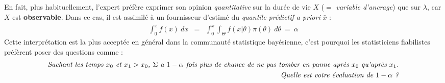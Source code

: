 En fait, plus habituellement, l'expert préfère exprimer son opinion \emph{quantitative} sur la durée de vie $X$
 ($=$ \emph{variable d'ancrage}) que sur $\lambda$, car $X$ est {\bf observable}. Dans ce cas, il est assimilé à un fournisseur d'estimé du \emph{quantile prédictif {\it a priori}} $\bar{x}$ :
\begin{eqnarray*}
\int_{0}^{\bar{x}} f(x) \ dx & = & \int_{0}^{\bar{x}} \int_{\Theta} f(x|\theta)\pi(\theta) \ d\theta \ = \ \alpha
\end{eqnarray*}
Cette interprétation est la plus acceptée en général dans la communauté statistique bayésienne, c'est pourquoi les statisticiens fiabilistes préfèrent poser des questions comme : 
\begin{eqnarray*}
\text{\it Sachant les temps $x_0$ et $x_1>x_0$, $\Sigma$ a $1-\alpha$ fois plus de chance de ne pas tomber en panne après $x_0$ qu'après $x_1$.} \\
\text{\it Quelle est votre évaluation de $1-\alpha$ ?} 
\end{eqnarray*}
